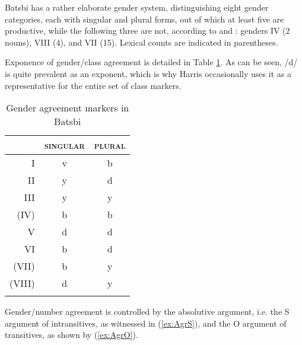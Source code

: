 \documentclass[output=paper]{langsci/langscibook}
\begin{document}
Batsbi has a rather elaborate gender system, distinguishing eight
gender categories, each with singular and plural forms, out of which
at least five are productive, while the following three are not,
according to \citet{Corbett:91} and \citet{holisky:gagua:94}: genders IV
(2 nouns), VIII (4), and VII (15). Lexical counts are indicated in
parentheses.

Exponence of gender/class agreement is detailed in Table
\ref{tab:ClassExp}. As can be seen, /d/ is quite prevalent as an
exponent, which is why Harris occasionally uses it as a representative
for the entire set of class markers. 

\begin{table}[htb]
  \centering
  \begin{tabular}{rcc}
    \lsptoprule
    & \textsc{singular} & \textsc{plural}\\
    \midrule
    I & v & b\\ 
    II & y & d\\ 
    III & y & y\\ 
    (IV) & b & b\\
    V & d & d\\ 
    VI & b & d\\
    (VII) & b & y \\
    (VIII) & d & y\\
    \lspbottomrule
  \end{tabular}
  \caption{Gender agreement markers in Batsbi}
  \label{tab:ClassExp}
\end{table}

Gender/number agreement is controlled by the absolutive argument,
i.e. the S argument of intransitives, as witnessed in (\ref{ex:AgrS}),
and the O argument of transitives, as shown by (\ref{ex:AgrO}).   


\begin{exe}
    
   \label{ex:AgrS}
  
   \label{ex:AgrO}

\end{exe}
\end{document}
